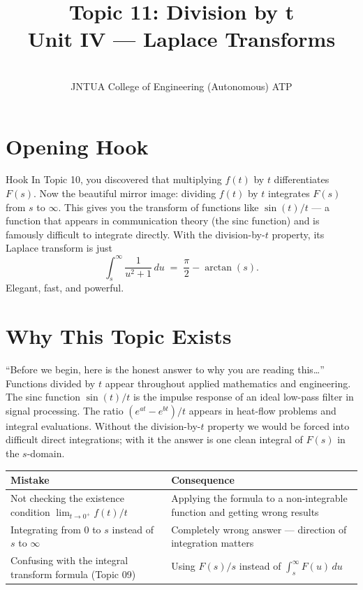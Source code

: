 \documentclass[12pt,a4paper]{article}
\title{Topic 11: Division by t \\ \large Unit IV --- Laplace Transforms}
\author{\\
        JNTUA College of Engineering (Autonomous) ATP}
\date{}
\begin{document}
\maketitle
\tableofcontents
\newpage

\section{Opening Hook}

\begin{curiositybox}{Hook}
In Topic 10, you discovered that multiplying $f(t)$ by $t$ differentiates $F(s)$.
Now the beautiful mirror image: dividing $f(t)$ by $t$ integrates $F(s)$ from
$s$ to $\infty$. This gives you the transform of functions like $\sin(t)/t$ ---
a function that appears in communication theory (the sinc function) and is
famously difficult to integrate directly. With the division-by-$t$ property,
its Laplace transform is just
\[
  \int_s^\infty \frac{1}{u^2+1}\,du \;=\; \frac{\pi}{2} - \arctan(s).
\]
Elegant, fast, and powerful.
\end{curiositybox}

\section{Why This Topic Exists}

``Before we begin, here is the honest answer to why you are reading this\ldots''
Functions divided by $t$ appear throughout applied mathematics and engineering.
The sinc function $\sin(t)/t$ is the impulse response of an ideal low-pass
filter in signal processing. The ratio $(e^{at}-e^{bt})/t$ appears in heat-flow
problems and integral evaluations. Without the division-by-$t$ property we would
be forced into difficult direct integrations; with it the answer is one clean
integral of $F(s)$ in the $s$-domain.

\medskip
\begin{center}
\begin{tabular}{@{}ll@{}}
\toprule
\textbf{Mistake} & \textbf{Consequence} \\
\midrule
Not checking the existence condition $\lim_{t\to 0^+} f(t)/t$ &
  Applying the formula to a non-integrable function and getting wrong results \\[4pt]
Integrating from $0$ to $s$ instead of $s$ to $\infty$ &
  Completely wrong answer --- direction of integration matters \\[4pt]
Confusing with the integral transform formula (Topic 09) &
  Using $F(s)/s$ instead of $\int_s^\infty F(u)\,du$ \\
\bottomrule
\end{tabular}
\end{center}
\end{document}

